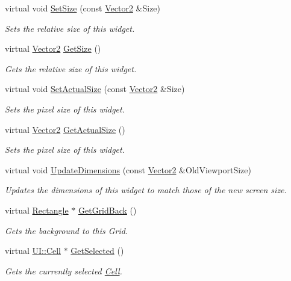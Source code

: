 \begin{DoxyCompactItemize}
virtual void \hyperlink{classphys_1_1UI_1_1CellGrid_a83de47589cb02ce49882f795e9281f57}{SetSize} (const \hyperlink{classphys_1_1Vector2}{Vector2} \&Size)
\begin{DoxyCompactList}\small\item\em Sets the relative size of this widget. \item\end{DoxyCompactList}\item 
virtual \hyperlink{classphys_1_1Vector2}{Vector2} \hyperlink{classphys_1_1UI_1_1CellGrid_aa0ad4f1e0159f8c6ca3928595dffd837}{GetSize} ()
\begin{DoxyCompactList}\small\item\em Gets the relative size of this widget. \item\end{DoxyCompactList}\item 
virtual void \hyperlink{classphys_1_1UI_1_1CellGrid_a86a0ff7a5a916278d901bae05df01847}{SetActualSize} (const \hyperlink{classphys_1_1Vector2}{Vector2} \&Size)
\begin{DoxyCompactList}\small\item\em Sets the pixel size of this widget. \item\end{DoxyCompactList}\item 
virtual \hyperlink{classphys_1_1Vector2}{Vector2} \hyperlink{classphys_1_1UI_1_1CellGrid_ad0ea7915446ba7821212e6a43aede7e1}{GetActualSize} ()
\begin{DoxyCompactList}\small\item\em Sets the pixel size of this widget. \item\end{DoxyCompactList}\item 
virtual void \hyperlink{classphys_1_1UI_1_1CellGrid_addbc1338b3b321018cbaf3ff787837e5}{UpdateDimensions} (const \hyperlink{classphys_1_1Vector2}{Vector2} \&OldViewportSize)
\begin{DoxyCompactList}\small\item\em Updates the dimensions of this widget to match those of the new screen size. \item\end{DoxyCompactList}\item 
virtual \hyperlink{classphys_1_1UI_1_1Rectangle}{Rectangle} $\ast$ \hyperlink{classphys_1_1UI_1_1CellGrid_a25796d285052da2f0d833e6c8694edd1}{GetGridBack} ()
\begin{DoxyCompactList}\small\item\em Gets the background to this Grid. \item\end{DoxyCompactList}\item 
virtual \hyperlink{classphys_1_1UI_1_1Cell}{UI::Cell} $\ast$ \hyperlink{classphys_1_1UI_1_1CellGrid_a4c68b88de0b02ef66ee192db430435ee}{GetSelected} ()
\begin{DoxyCompactList}\small\item\em Gets the currently selected \hyperlink{classphys_1_1UI_1_1Cell}{Cell}. \item\end{DoxyCompactList}\end{DoxyCompactItemize}
